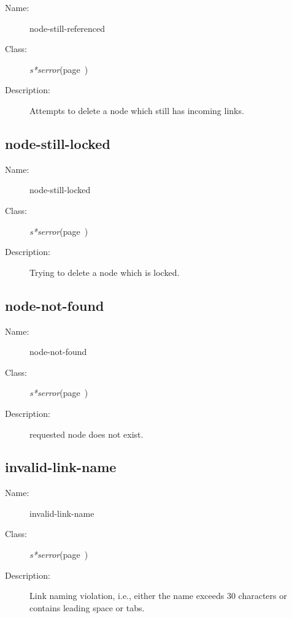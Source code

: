 \begin{description}

\item [Name:]  node-still-referenced


\item [Class:]
{\sl s*serror}\hfill(page~\pageref{s*serror})


\item [Description:]
Attempts to delete a node which still has incoming links.


\end{description}
\horizontalline

\subsection{node-still-locked}
\label{node-still-locked}

\begin{description}
\item [Name:]  node-still-locked


\item [Class:]
{\sl s*serror}\hfill(page~\pageref{s*serror})


\item [Description:]
Trying to delete a node which is locked. 


\end{description}
\horizontalline

\subsection{node-not-found}
\label{node-not-found}

\begin{description}
\item [Name:]  node-not-found

\item [Class:]
{\sl s*serror}\hfill(page~\pageref{s*serror})

\item [Description:] requested node does not exist.



\end{description}
\horizontalline

\subsection{invalid-link-name}
\label{invalid-link-name}

\begin{description}
\item [Name:]  invalid-link-name


\item [Class:]
{\sl s*serror}\hfill(page~\pageref{s*serror})


\item [Description:]
Link naming violation, i.e., either the name exceeds 30
characters or contains leading space or tabs.


\end{description}
\horizontalline

